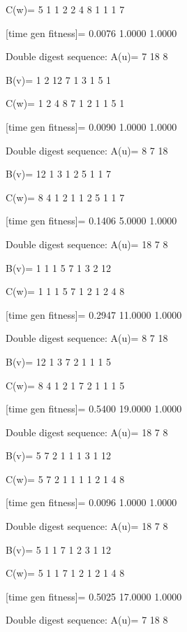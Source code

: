 C(w)=
     5     1     1     2     2     4     8     1     1     1     7

[time gen fitness]=
    0.0076    1.0000    1.0000

Double digest sequence:
A(u)=
     7    18     8

B(v)=
     1     2    12     7     1     3     1     5     1

C(w)=
     1     2     4     8     7     1     2     1     1     5     1

[time gen fitness]=
    0.0090    1.0000    1.0000

Double digest sequence:
A(u)=
     8     7    18

B(v)=
    12     1     3     1     2     5     1     1     7

C(w)=
     8     4     1     2     1     1     2     5     1     1     7

[time gen fitness]=
    0.1406    5.0000    1.0000

Double digest sequence:
A(u)=
    18     7     8

B(v)=
     1     1     1     5     7     1     3     2    12

C(w)=
     1     1     1     5     7     1     2     1     2     4     8

[time gen fitness]=
    0.2947   11.0000    1.0000

Double digest sequence:
A(u)=
     8     7    18

B(v)=
    12     1     3     7     2     1     1     1     5

C(w)=
     8     4     1     2     1     7     2     1     1     1     5

[time gen fitness]=
    0.5400   19.0000    1.0000

Double digest sequence:
A(u)=
    18     7     8

B(v)=
     5     7     2     1     1     1     3     1    12

C(w)=
     5     7     2     1     1     1     1     2     1     4     8

[time gen fitness]=
    0.0096    1.0000    1.0000

Double digest sequence:
A(u)=
    18     7     8

B(v)=
     5     1     1     7     1     2     3     1    12

C(w)=
     5     1     1     7     1     2     1     2     1     4     8

[time gen fitness]=
    0.5025   17.0000    1.0000

Double digest sequence:
A(u)=
     7    18     8

